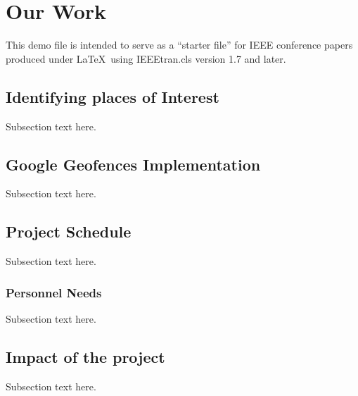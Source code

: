\section{Our Work}
This demo file is intended to serve as a ``starter file''
for IEEE conference papers produced under \LaTeX\ using
IEEEtran.cls version 1.7 and later.

\subsection{Identifying places of Interest}
Subsection text here.

\subsection{Google Geofences Implementation}
Subsection text here.

\subsection{Project Schedule}
Subsection text here.

\subsubsection{Personnel Needs}
Subsection text here.

\subsection{Impact of the project}
Subsection text here.



